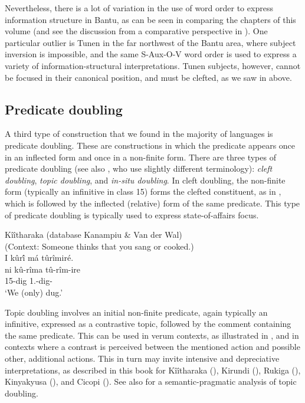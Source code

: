 \documentclass[output=paper]{langscibook}
\begin{document}
Nevertheless, there is a lot of variation in the use of word order to express information structure in Bantu, as can be seen in comparing the chapters of this volume (and see the discussion from a comparative perspective in \citet{KerrEtAl2023}). One particular outlier is Tunen in the far northwest of the Bantu area, where subject inversion is impossible, and the same S-Aux-O-V word order is used to express a variety of information-structural interpretations. Tunen subjects, however, cannot be focused in their canonical position, and must be clefted, as we saw in  above.

\subsection{Predicate doubling}
\label{bkm:Ref147299258}
A third type of construction that we found in the majority of languages is predicate doubling. These are constructions in which the predicate appears once in an inflected form and once in a non-finite form. There are three types of predicate doubling (see also \citealt{GüldemannFiedler2022}, who use slightly different terminology): \textit{cleft doubling}, \textit{topic doubling}, and \textit{in-situ doubling}. In cleft doubling, the non-finite form (typically an infinitive in class 15) forms the clefted constituent, as in , which is followed by the inflected (relative) form of the same predicate. This type of predicate doubling is typically used to express state-of-affairs focus.

\ea
\label{bkm:Ref151383677}
Kîîtharaka (database Kanampiu \& Van der Wal)\\
(Context: Someone thinks that you sang or cooked.)\\
I kûr\'{î} má tûrîmiré.\\
\gll
ni  kû-rîma  tû-rîm-ire\\
\FOC{}  15-dig  1\PL.\SM{}-dig-\PFV{}\\
\glt ‘We (only) dug.’

\z

Topic doubling involves an initial non-finite predicate, again typically an infinitive, expressed as a contrastive topic, followed by the comment containing the same predicate. This can be used in verum contexts, as illustrated in , and in contexts where a contrast is perceived between the mentioned action and possible other, additional actions. This in turn may invite intensive and depreciative interpretations, as described in this book for Kîîtharaka (), Kirundi (), Rukiga (), Kinyakyusa (), and Cicopi (). See also \citet{JerrovanderWalFut} for a semantic-pragmatic analysis of topic doubling.
\end{document}
